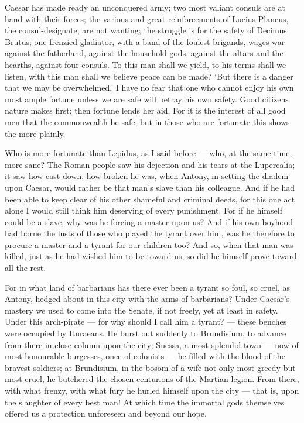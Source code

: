  Caesar has made ready an unconquered army; two most valiant consuls are at hand with their forces; the various and great reinforcements of Lucius Plancus, the consul-designate, are not wanting; the struggle is for the safety of Decimus Brutus; one frenzied gladiator, with a band of the foulest brigands, wages war against the fatherland, against the household gods, against the altars and the hearths, against four consuls. To this man shall we yield, to his terms shall we listen, with this man shall we believe peace can be made? `But there is a danger that we may be overwhelmed.' I have no fear that one who cannot enjoy his own most ample fortune unless we are safe will betray his own safety. Good citizens nature makes first; then fortune lends her aid. For it is the interest of all good men that the commonwealth be safe; but in those who are fortunate this shows the more plainly.

 Who is more fortunate than Lepidus, as I said before --- who, at the same time, more sane? The Roman people saw his dejection and his tears at the Lupercalia; it saw how cast down, how broken he was, when Antony, in setting the diadem upon Caesar, would rather be that man's slave than his colleague. And if he had been able to keep clear of his other shameful and criminal deeds, for this one act alone I would still think him deserving of every punishment. For if he himself could be a slave, why was he forcing a master upon us? And if his own boyhood had borne the lusts of those who played the tyrant over him, was he therefore to procure a master and a tyrant for our children too? And so, when that man was killed, just as he had wished him to be toward us, so did he himself prove toward all the rest.

 For in what land of barbarians has there ever been a tyrant so foul, so cruel, as Antony, hedged about in this city with the arms of barbarians? Under Caesar's mastery we used to come into the Senate, if not freely, yet at least in safety. Under this arch-pirate --- for why should I call him a tyrant? --- these benches were occupied by Ituraeans. He burst out suddenly to Brundisium, to advance from there in close column upon the city; Suessa, a most splendid town --- now of most honourable burgesses, once of colonists --- he filled with the blood of the bravest soldiers; at Brundisium, in the bosom of a wife not only most greedy but most cruel, he butchered the chosen centurions of the Martian legion. From there, with what frenzy, with what fury he hurled himself upon the city --- that is, upon the slaughter of every best man! At which time the immortal gods themselves offered us a protection unforeseen and beyond our hope.

